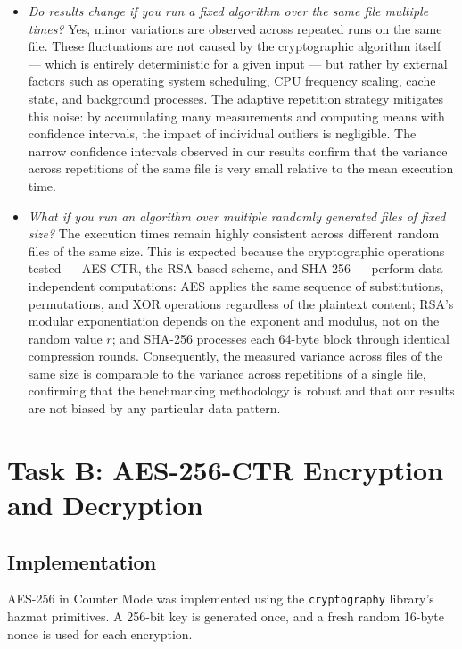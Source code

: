 \documentclass[10pt,a4paper]{article}
\begin{document}
\begin{itemize}
    \item \textit{Do results change if you run a fixed algorithm over the same file multiple times?} Yes, minor variations are observed across repeated runs on the same file. These fluctuations are not caused by the cryptographic algorithm itself --- which is entirely deterministic for a given input --- but rather by external factors such as operating system scheduling, CPU frequency scaling, cache state, and background processes. The adaptive repetition strategy mitigates this noise: by accumulating many measurements and computing means with confidence intervals, the impact of individual outliers is negligible. The narrow confidence intervals observed in our results confirm that the variance across repetitions of the same file is very small relative to the mean execution time.
    \item \textit{What if you run an algorithm over multiple randomly generated files of fixed size?} The execution times remain highly consistent across different random files of the same size. This is expected because the cryptographic operations tested --- AES-CTR, the RSA-based scheme, and SHA-256 --- perform data-independent computations: AES applies the same sequence of substitutions, permutations, and XOR operations regardless of the plaintext content; RSA's modular exponentiation depends on the exponent and modulus, not on the random value $r$; and SHA-256 processes each 64-byte block through identical compression rounds. Consequently, the measured variance across files of the same size is comparable to the variance across repetitions of a single file, confirming that the benchmarking methodology is robust and that our results are not biased by any particular data pattern.
\end{itemize}

\section{Task B: AES-256-CTR Encryption and Decryption}
\label{sec:aes}

\subsection{Implementation}

AES-256 in Counter Mode was implemented using the \texttt{cryptography} library's hazmat primitives. A 256-bit key is generated once, and a fresh random 16-byte nonce is used for each encryption.
\end{document}
